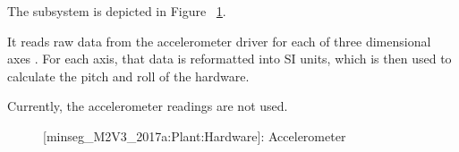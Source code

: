 \documentclass[crop=false,float=true,class=scrreprt]{standalone}
\begin{document}
\label{SEC:testPlatform:simulink:plant:hardware:accelerometer}

The  subsystem is depicted in Figure~%
\ref{FIG:testPlatform:simulink:plant:hardware:accelerometer}.

It reads raw data from the accelerometer driver for each of three dimensional axes
{\fns[\tif{x, y, z}]}.
For each axis, that data is reformatted into SI units,
which is then used to calculate the pitch and roll of the hardware.

Currently, the accelerometer readings are not used.




\clearpage




\begin{landscape}
\begin{figure}[H]%
\centering%
\begin{minipage}[c][0.995\textheight][c]{0.995\linewidth}%
\centering%
%
\caption[{[minseg\_M2V3\_2017a:Plant:Hardware]: Accelerometer}]%
        {{[minseg\_M2V3\_2017a:Plant:Hardware]: Accelerometer%
          \label{FIG:testPlatform:simulink:plant:hardware:accelerometer}%
        }}%
\end{minipage}%
\end{figure}
\end{landscape}




\clearpage
\end{document}
